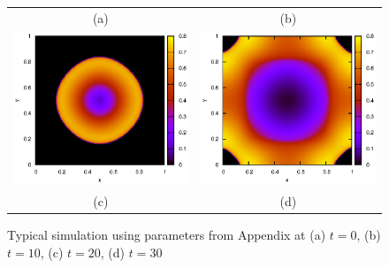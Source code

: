 \documentclass{article}
\theoremstyle{plain}
\begin{document}
\begin{figure}[h!tb]
\begin{center}
\begin{tabular}{c c}
        (a) & (b) \\
        \includegraphics[scale = 0.5]{typicalSim-t20.eps}&
        \includegraphics[scale = 0.5]{typicalSim-t30.eps}\\
        (c) & (d) \\
      \end{tabular}
      \caption{Typical simulation using parameters from Appendix at (a) $t = 0$, (b) $t = 10$, (c) $t = 20$, (d) $t = 30$}
      \label{fig:typical_simulation_results}
      \end{center}
    \end{figure}
\end{document}

